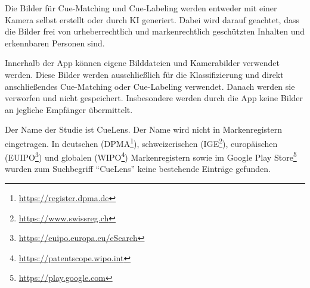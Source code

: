 Die Bilder für Cue-Matching und Cue-Labeling werden entweder mit einer Kamera selbst erstellt oder durch KI generiert. Dabei wird darauf geachtet, dass die Bilder frei von urheberrechtlich und markenrechtlich geschützten Inhalten und erkennbaren Personen sind.

Innerhalb der App können eigene Bilddateien und Kamerabilder verwendet werden. Diese Bilder werden ausschließlich für die Klassifizierung und direkt anschließendes Cue-Matching oder Cue-Labeling verwendet. Danach werden sie ver\-worfen und nicht gespeichert. Insbesondere werden durch die App keine Bilder an jegliche Empfänger übermittelt.

Der Name der Studie ist CueLens. Der Name wird nicht in Markenregistern eingetragen. In deutschen (DPMA\footnote{\url{https://register.dpma.de}}), schweize\-rischen (IGE\footnote{\url{https://www.swissreg.ch}}), europäischen (EUIPO\footnote{\url{https://euipo.europa.eu/eSearch}}) und globalen (WIPO\footnote{\url{https://patentscope.wipo.int}}) Markenregistern sowie im Google Play Store\footnote{\url{https://play.google.com}} wurden zum Suchbegriff \enquote{CueLens} keine bestehende Einträge gefunden.

